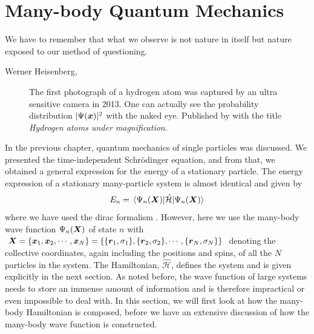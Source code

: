 \chapter{Many-body Quantum Mechanics} \label{chp:manybody}
\epigraph{We have to remember that what we observe is not nature in itself but
	nature exposed to our method of questioning.}{Werner Heisenberg, \supercite{heisenberg_across_1990}}
\begin{figure}[H]
	\centering
	\captionsetup[subfigure]{labelformat=empty}
	\caption{The first photograph of a hydrogen atom was captured by an ultra sensitive camera in 2013. One can actually see the probability distribution $|\Psi(\boldsymbol{{x}})|^2$ with the naked eye. Published by \citet{stodolna_hydrogen_2013} with the title \textit{Hydrogen atoms under magnification}.}
\end{figure}

\sloppy
In the previous chapter, quantum mechanics of single particles was discussed. We presented the time-independent Schrödinger equation, and from that, we obtained a general expression for the energy of a stationary particle. The energy expression of a stationary many-particle system is almost identical and given by
\begin{equation}
E_n=\mel{\Psi_n(\bs{X})}{\hat{\mathcal{H}}}{\Psi_n(\bs{X})}
\label{eq:energy}
\end{equation}
where we have used the dirac formalism \supercite{dirac_new_1939}. However, here we use the many-body wave function $\Psi_n(\boldsymbol{{X}})$ of state $n$ with $\boldsymbol{{X}}=\{\boldsymbol{{x}}_1,\boldsymbol{{x}}_2,\cdots,\boldsymbol{{x}}_N\}=\{\{\boldsymbol{{r}}_1, \sigma_1\}, \{\boldsymbol{{r}}_2, \sigma_2\},\cdots,\{\boldsymbol{{r}}_N, \sigma_N\}\}$ denoting the collective coordinates, again including the positions and spins, of all the $N$ particles in the system. The Hamiltonian, $\hat{\mathcal{H}}$, defines the system and is given explicitly in the next section. As noted before, the wave function of large systems needs to store an immense amount of information and is therefore impractical or even impossible to deal with. In this section, we will first look at how the many-body Hamiltonian is composed, before we have an extensive discussion of how the many-body wave function is constructed.

